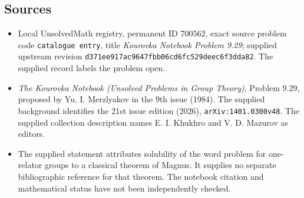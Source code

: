 \documentclass[11pt]{article}
\begin{document}
\subsection{Sources}
\begin{itemize}
\item Local UnsolvedMath registry, permanent ID \(700562\), exact source problem code \texttt{catalogue entry}, title \emph{Kourovka Notebook Problem 9.29}; supplied upstream revision \texttt{d371ee917ac9647fbb06cd6fc529deec6f3dda82}. The supplied record labels the problem open.
\item \emph{The Kourovka Notebook (Unsolved Problems in Group Theory)}, Problem 9.29, proposed by Yu. I. Merzlyakov in the 9th issue (1984). The supplied background identifies the 21st issue edition (2026), \texttt{arXiv:1401.0300v48}. The supplied collection description names E. I. Khukhro and V. D. Mazurov as editors.
\item The supplied statement attributes solubility of the word problem for one-relator groups to a classical theorem of Magnus. It supplies no separate bibliographic reference for that theorem. The notebook citation and mathematical status have not been independently checked.
\end{itemize}
\end{document}
